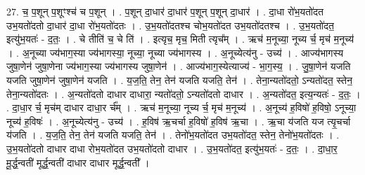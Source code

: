 \documentclass[17pt]{extarticle}
\begin{document}
27. च॒ प॒शून् प॒शूꣳश्च॑ च प॒शून् । . प॒शून् दा॒धार॑ दा॒धार॑ प॒शून् प॒शून् दा॒धार॑ । . दा॒धा रो॑भ॒यतो॑दत उभ॒यतो॑दतो दा॒धार॑ दा॒धा रो॑भ॒यतो॑दतः । . उ॒भ॒यतो॑दतश्च चोभ॒यतो॑दत उभ॒यतो॑दतश्च । . उ॒भ॒यतो॑दत॒ इत्यु॑भ॒यतः॑ - द॒तः॒ । . चे तीति॑ च॒ चे ति॑ । . इत्यृच॒ मृच॒ मिती त्यृच᳚म् । . ऋच॑ म॒नूच्या॒ नूच्य र्च॒ मृच॑ म॒नूच्य॑ । . अ॒नूच्या ज्य॑भाग॒स्या ज्य॑भागस्या॒ नूच्या॒ नूच्या ज्य॑भागस्य । . अ॒नूच्येत्य॑नु - उच्य॑ । . आज्य॑भागस्य जुषा॒णेन॑ जुषा॒णेना ज्य॑भाग॒स्या ज्य॑भागस्य जुषा॒णेन॑ । . आज्य॑भाग॒स्येत्याज्य॑ - भा॒ग॒स्य॒ । . जु॒षा॒णेन॑ यजति यजति जुषा॒णेन॑ जुषा॒णेन॑ यजति । . य॒ज॒ति॒ तेन॒ तेन॑ यजति यजति॒ तेन॑ । . तेना॒न्यतो॑दतो॒ ऽन्यतो॑दत॒ स्तेन॒ तेना॒न्यतो॑दतः । . अ॒न्यतो॑दतो दाधार दाधारा॒ न्यतो॑दतो॒ ऽन्यतो॑दतो दाधार । . अ॒न्यतो॑दत॒ इत्य॒न्यतः॑ - द॒तः॒ । . दा॒धा॒र र्च॒ मृच॑म् दाधार दाधा॒र र्च᳚म् । . ऋच॑ म॒नूच्या॒ नूच्य र्च॒ मृच॑ म॒नूच्य॑ । . अ॒नूच्य॑ ह॒विषो॑ ह॒विषो॒ ऽनूच्या॒ नूच्य॑ ह॒विषः॑ । . अ॒नूच्येत्य॑नु - उच्य॑ । . ह॒विष॑ ऋ॒चर्चा ह॒विषो॑ ह॒विष॑ ऋ॒चा । . ऋ॒चा य॑जति यज त्यृ॒चर्चा य॑जति । . य॒ज॒ति॒ तेन॒ तेन॑ यजति यजति॒ तेन॑ । . तेनो॑भ॒यतो॑दत उभ॒यतो॑दत॒ स्तेन॒ तेनो॑भ॒यतो॑दतः । . उ॒भ॒यतो॑दतो दाधार दाधा रोभ॒यतो॑दत उभ॒यतो॑दतो दाधार । . उ॒भ॒यतो॑दत॒ इत्यु॑भ॒यतः॑ - द॒तः॒ । . दा॒धा॒र॒ मू॒र्द्ध॒न्वती॑ मूर्द्ध॒न्वती॑ दाधार दाधार मूर्द्ध॒न्वती᳚ । \newline
\end{document}

